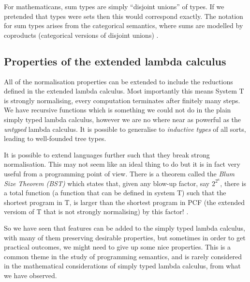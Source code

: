 \begin{remark}
    For mathematicans, sum types are simply ``disjoint unions'' of types. If we pretended that types were sets then this would correspond exactly. The notation for sum types arises from the categorical semantics, where sums are modelled by coproducts (categorical versions of disjoint unions) \cite{LambekJ1986Itho}. 
\end{remark}

\subsection{Properties of the extended lambda calculus}

All of the normalisation properties can be extended to include the reductions defined in the extended lambda calculus. Most importantly this means System T is strongly normalising, every computation terminates after finitely many steps.
We have recursive functions which is something we could not do in the plain simply typed lambda calculus, however we are no where near as powerful as the \emph{untyped} lambda calculus. It is possible to generalise to \emph{inductive types} of all sorts, leading to well-founded tree types.

It is possible to extend languages further such that they break strong normalisation. This may not seem like an ideal thing to do but it is in fact very useful from a programming point of view. There is a theorem called the \emph{Blum Size Theorem (BST)} which states that, given any blow-up factor, say $2^{2^n}$, there is a total function (a function that can be defined in system T) such that the shortest program in T, is larger than the shortest program in PCF (the extended versiom of T that is not strongly normalising) by this factor! \cite{harper_2016}.

So we have seen that features can be added to the simply typed lambda calculus, with many of them preserving desirable properties, but sometimes in order to get practical outcomes, we might need to give up some nice properties. This is a common theme in the study of programming semantics, and is rarely considered in the mathematical considerations of simply typed lambda calculus, from what we have observed.



